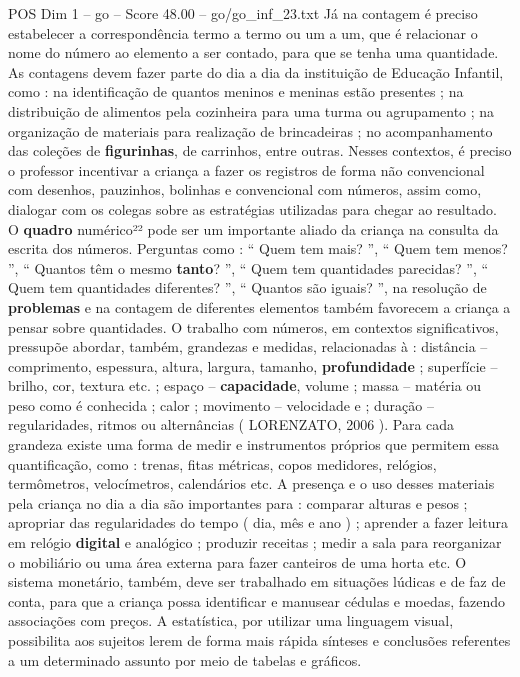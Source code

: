 \begin{textsample}{POS Dim 1 – go – Score 48.00 – go/go\_inf\_23.txt}
Já na contagem é preciso estabelecer a correspondência termo a termo ou um a um, que é relacionar o nome do número ao elemento a ser contado, para que se tenha uma quantidade.
As contagens devem fazer parte do dia a dia da instituição de Educação Infantil, como : na identificação de quantos meninos e meninas estão presentes ; na distribuição de alimentos pela cozinheira para uma turma ou agrupamento ; na organização de materiais para realização de brincadeiras ; no acompanhamento das coleções de \textbf{figurinhas}, de carrinhos, entre outras.
Nesses contextos, é preciso o professor incentivar a criança a fazer os registros de forma não convencional com desenhos, pauzinhos, bolinhas e convencional com números, assim como, dialogar com os colegas sobre as estratégias utilizadas para chegar ao resultado.
O \textbf{quadro} numérico²² pode ser um importante aliado da criança na consulta da escrita dos números.
Perguntas como : “ Quem tem mais? ”, “ Quem tem menos? ”, “ Quantos têm o mesmo \textbf{tanto}? ”, “ Quem tem quantidades parecidas? ”, “ Quem tem quantidades diferentes? ”, “ Quantos são iguais? ”, na resolução de \textbf{problemas} e na contagem de diferentes elementos também favorecem a criança a pensar sobre quantidades.
O trabalho com números, em contextos significativos, pressupõe abordar, também, grandezas e medidas, relacionadas à : distância – comprimento, espessura, altura, largura, tamanho, \textbf{profundidade} ; superfície – brilho, cor, textura etc. ; espaço – \textbf{capacidade}, volume ; massa – matéria ou peso como é conhecida ; calor ; movimento – velocidade e ; duração – regularidades, ritmos ou alternâncias ( LORENZATO, 2006 ).
Para cada grandeza existe uma forma de medir e instrumentos próprios que permitem essa quantificação, como : trenas, fitas métricas, copos medidores, relógios, termômetros, velocímetros, calendários etc.
A presença e o uso desses materiais pela criança no dia a dia são importantes para : comparar alturas e pesos ; apropriar das regularidades do tempo ( dia, mês e ano ) ; aprender a fazer leitura em relógio \textbf{digital} e analógico ; produzir receitas ; medir a sala para reorganizar o mobiliário ou uma área externa para fazer canteiros de uma horta etc.
O sistema monetário, também, deve ser trabalhado em situações lúdicas e de faz de conta, para que a criança possa identificar e manusear cédulas e moedas, fazendo associações com preços.
A estatística, por utilizar uma linguagem visual, possibilita aos sujeitos lerem de forma mais rápida sínteses e conclusões referentes a um determinado assunto por meio de tabelas e gráficos.

\end{textsample}
